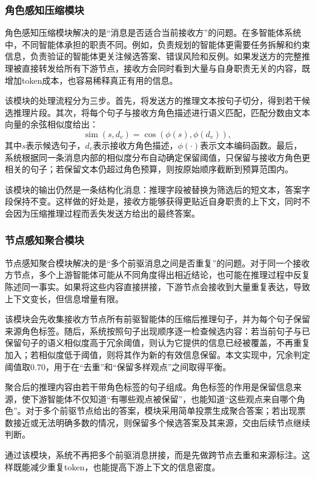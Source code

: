 \subsubsection{角色感知压缩模块}

角色感知压缩模块解决的是“消息是否适合当前接收方”的问题。在多智能体系统中，不同智能体承担的职责不同。例如，负责规划的智能体更需要任务拆解和约束信息，负责验证的智能体更关注候选答案、错误风险和反例。如果发送方的完整推理被直接转发给所有下游节点，接收方会同时看到大量与自身职责无关的内容，既增加token成本，也容易稀释真正有用的信息。

该模块的处理流程分为三步。首先，将发送方的推理文本按句子切分，得到若干候选推理片段。其次，将每个句子与接收方角色描述进行语义匹配，匹配分数由文本向量的余弦相似度给出：
$$
\operatorname{sim}(s,d_v)=\cos(\phi(s),\phi(d_v)),
$$
其中$s$表示候选句子，$d_v$表示接收方角色描述，$\phi(\cdot)$表示文本编码函数。最后，系统根据同一条消息内部的相似度分布自动确定保留阈值，只保留与接收方角色更相关的句子；若保留文本仍超过角色预算，则按原始顺序截断到预算范围内。

该模块的输出仍然是一条结构化消息：推理字段被替换为筛选后的短文本，答案字段保持不变。这样做的好处是，接收方能够获得更贴近自身职责的上下文，同时不会因为压缩推理过程而丢失发送方给出的最终答案。

\subsubsection{节点感知聚合模块}

节点感知聚合模块解决的是“多个前驱消息之间是否重复”的问题。对于同一个接收方节点，多个上游智能体可能从不同角度得出相近结论，也可能在推理过程中反复陈述同一事实。如果将这些内容直接拼接，下游节点会接收到大量重复表达，导致上下文变长，但信息增量有限。

该模块会先收集接收方节点所有前驱智能体的压缩后推理句子，并为每个句子保留来源角色标签。随后，系统按照句子出现顺序逐一检查候选内容：若当前句子与已保留句子的语义相似度高于冗余阈值，则认为它提供的信息已经被覆盖，不再重复加入；若相似度低于阈值，则将其作为新的有效信息保留。本文实现中，冗余判定阈值取$0.70$，用于在“去重”和“保留多样观点”之间取得平衡。

聚合后的推理内容由若干带角色标签的句子组成。角色标签的作用是保留信息来源，使下游智能体不仅知道“有哪些观点被保留”，也能知道“这些观点来自哪个角色”。对于多个前驱节点给出的答案，模块采用简单投票生成聚合答案；若出现票数接近或无法明确多数的情况，则保留多个候选答案及其来源，交由后续节点继续判断。

通过该模块，系统不再把多个前驱消息拼接，而是先做跨节点去重和来源标注。这样既能减少重复token，也能提高下游上下文的信息密度。

